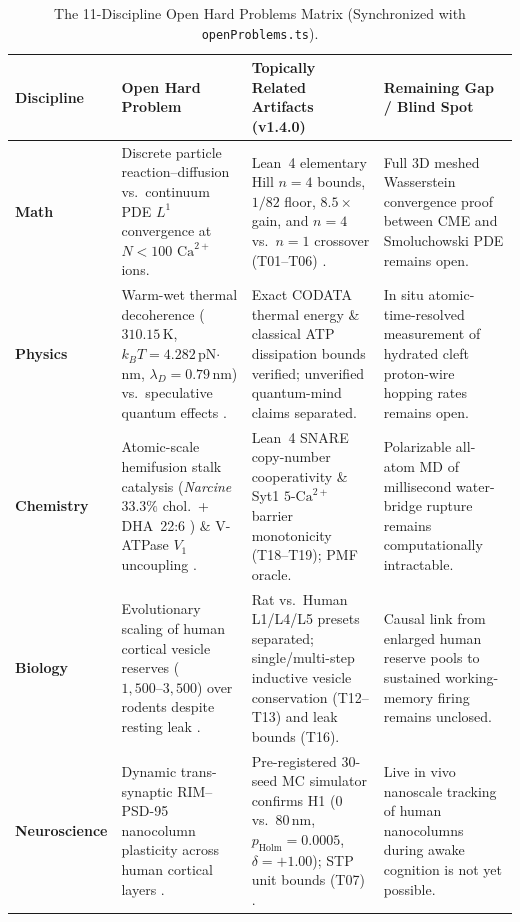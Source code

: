 \documentclass[11pt,letterpaper]{amsart}
\begin{document}
\begin{table}[htbp]
\centering
\caption{The 11-Discipline Open Hard Problems Matrix (Synchronized with \texttt{openProblems.ts}).}
\label{tab:op11}
\scriptsize
\begin{tabularx}{\textwidth}{@{}>{\raggedright\arraybackslash}p{2.25cm}>{\raggedright\arraybackslash}p{3.45cm}>{\raggedright\arraybackslash}p{4.15cm}L@{}}
\toprule
\textbf{Discipline} & \textbf{Open Hard Problem} & \textbf{Topically Related Artifacts (v1.4.0)} & \textbf{Remaining Gap / Blind Spot} \\
\midrule
\textbf{Math} & Discrete particle reaction--diffusion vs.\ continuum PDE $L^1$ convergence at $N < 100$ $\mathrm{Ca}^{2+}$ ions. & Lean~4 elementary Hill $n=4$ bounds, $1/82$ floor, $8.5\times$ gain, and $n=4$ vs.\ $n=1$ crossover (T01--T06) \cite{dodge1967calcium}. & Full 3D meshed Wasserstein convergence proof between CME and Smoluchowski PDE remains open. \\
\textbf{Physics} & Warm-wet thermal decoherence ($310.15\,$K, $k_B T = 4.282\,$pN$\cdot$nm, $\lambda_D = 0.79\,$nm) vs.\ speculative quantum effects \cite{tegmark2000decoherence}. & Exact CODATA thermal energy \& classical ATP dissipation bounds verified; unverified quantum-mind claims separated. & In situ atomic-time-resolved measurement of hydrated cleft proton-wire hopping rates remains open. \\
\textbf{Chemistry} & Atomic-scale hemifusion stalk catalysis (\emph{Narcine} $33.3\%$ chol.\ + DHA~22:6 \cite{deutsch1981lipids}) \& V-ATPase $V_1$ uncoupling \cite{coupland2024vatpase,wang2024vatpase}. & Lean~4 SNARE copy-number cooperativity \& Syt1 $5$-$\mathrm{Ca}^{2+}$ barrier monotonicity (T18--T19); PMF oracle. & Polarizable all-atom MD of millisecond water-bridge rupture remains computationally intractable. \\
\textbf{Biology} & Evolutionary scaling of human cortical vesicle reserves ($1{,}500\text{--}3{,}500$) over rodents despite resting leak \cite{rollenhagen2024l1,pulido2021resting}. & Rat vs.\ Human L1/L4/L5 presets separated; single/multi-step inductive vesicle conservation (T12--T13) and leak bounds (T16). & Causal link from enlarged human reserve pools to sustained working-memory firing remains unclosed. \\
\textbf{Neuroscience} & Dynamic trans-synaptic RIM--PSD-95 nanocolumn plasticity across human cortical layers \cite{tang2016nanocolumn,shapsoncoe2024h01}. & Pre-registered 30-seed MC simulator confirms H1 ($0$ vs.\ $80\,$nm, $p_{\mathrm{Holm}}=0.0005$, $\delta=+1.00$); STP unit bounds (T07) \cite{tsodyks1998dynamic}. & Live in vivo nanoscale tracking of human nanocolumns during awake cognition is not yet possible. \\

\end{tabularx}
\end{table}
\end{document}
